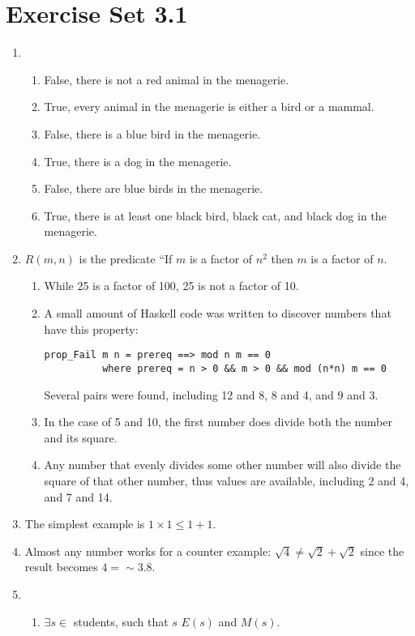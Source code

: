 \documentclass[12pt]{article}
\begin{document}
\section*{Exercise Set 3.1}
\begin{enumerate}
\item %
  \begin{enumerate}
  \item False, there is not a red animal in the menagerie.
  \item True, every animal in the menagerie is either a bird or a mammal.
  \item False, there is a blue bird in the menagerie.
  \item True, there is a dog in the menagerie.
  \item False, there are blue birds in the menagerie.
  \item True, there is at least one black bird, black cat, and black
    dog in the menagerie.
  \end{enumerate}
\setcounter{enumi}{5} %
\item
  $R(m,n)$ is the predicate ``If $m$ is a factor of $n^{2}$ then $m$
  is a factor of $n$.
  \begin{enumerate}
  \item While 25 is a factor of 100, 25 is not a factor of 10.
  \item A small amount of Haskell code was written to discover numbers
    that have this property:
\begin{verbatim}
prop_Fail m n = prereq ==> mod n m == 0
          where prereq = n > 0 && m > 0 && mod (n*n) m == 0
\end{verbatim}
Several pairs were found, including 12 and 8, 8 and 4, and 9 and 3.
\item In the case of 5 and 10, the first number does divide both the
  number and its square.
\item Any number that evenly divides some other number will also
  divide the square of that other number, thus values are available,
  including 2 and 4, and 7 and 14.
  \end{enumerate}

\setcounter{enumi}{10} %
\item The simplest example is $1 \times 1 \leq 1 + 1$.
\item Almost any number works for a counter example: $\sqrt{4} \neq
  \sqrt{2} + \sqrt{2}$ since the result becomes $4 = \sim 3.8$.
\setcounter{enumi}{17} %
\item
  \begin{enumerate}
  \item $\exists s\in$ students, such that $s$ $E(s)$ and $M(s)$.
  \end{enumerate}


\end{enumerate}
\end{document}
